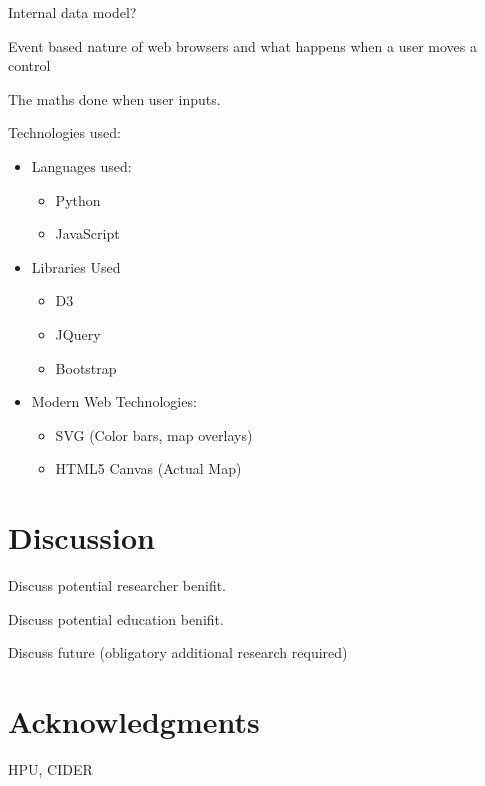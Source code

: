 \documentclass[12pt,a4paper]{article}
\begin{document}
  Internal data model?

  Event based nature of web browsers and what happens when a user moves a control

  The maths done when user inputs.

Technologies used:
\begin{itemize}
  \item Languages used:
  \begin{itemize}
    \item Python
    \item JavaScript
  \end{itemize}
  \item  Libraries Used
  \begin{itemize}
    \item D3
    \item JQuery
    \item Bootstrap
  \end{itemize}
  \item Modern Web Technologies:
  \begin{itemize}
    \item SVG (Color bars, map overlays)
    \item HTML5 Canvas (Actual Map)
  \end{itemize}
\end{itemize}
\section{Discussion}
Discuss potential researcher benifit.

Discuss potential education benifit.

Discuss future (obligatory additional research required)
\section{Acknowledgments}
HPU, CIDER


\end{document}

